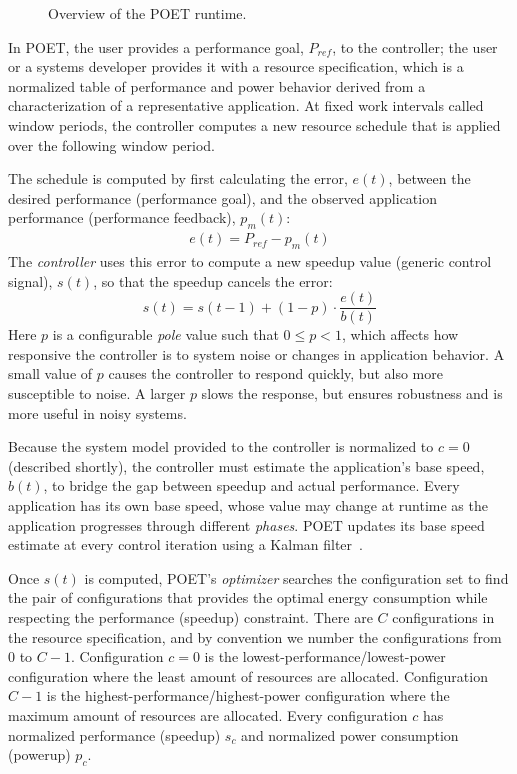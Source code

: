 \begin{figure}[t]
  \begin{centering}
    
    \caption{Overview of the POET runtime.}
    \label{fig:poet-runtime}
  \end{centering}
\end{figure}

In POET, the user provides a performance goal, $P_{ref}$, to the controller; the user or a systems developer provides it with a resource specification, which is a normalized table of performance and power behavior derived from a characterization of a representative application.
At fixed work intervals called window periods, the controller computes a new resource schedule that is applied over the following window period.

The schedule is computed by first calculating the error, $e(t)$, between the desired performance (performance goal), and the observed application performance (performance feedback), $p_m(t)$:
\begin{eqnarray}
  e(t) = P_{ref} - p_m(t)
  \label{eqn:error}
\end{eqnarray}
The \emph{controller} uses this error to compute a new speedup value (generic control signal), $s(t)$, so that the speedup cancels the error:
\begin{equation}
  s(t) = s(t-1) + (1-p) \cdot \frac{e(t)}{b(t)} 
  \label{eqn:poet-control}
\end{equation}
Here $p$ is a configurable \emph{pole} value such that $0 \le p < 1$, which affects how responsive the controller is to system noise or changes in application behavior.
A small value of $p$ causes the controller to respond quickly, but also more susceptible to noise.
A larger $p$ slows the response, but ensures robustness and is more useful in noisy systems.

Because the system model provided to the controller is normalized to $c=0$ (described shortly), the controller must estimate the application's base speed, $b(t)$, to bridge the gap between speedup and actual performance.
Every application has its own base speed, whose value may change at runtime as the application progresses through different \emph{phases}.
POET updates its base speed estimate at every control iteration using a Kalman filter~\cite{welch2006kalman}.

Once $s(t)$ is computed, POET's \emph{optimizer} searches the configuration set to find the pair of configurations that provides the optimal energy consumption while respecting the performance (speedup) constraint.
There are $C$ configurations in the resource specification, and by convention we number the configurations from $0$ to $C-1$.
Configuration $c = 0$ is the lowest-performance/lowest-power configuration where the least amount of resources are allocated.
Configuration $C-1$ is the highest-performance/highest-power configuration where the maximum amount of resources are allocated.
Every configuration $c$ has normalized performance (speedup) $s_c$ and normalized power consumption (powerup) $p_c$.


